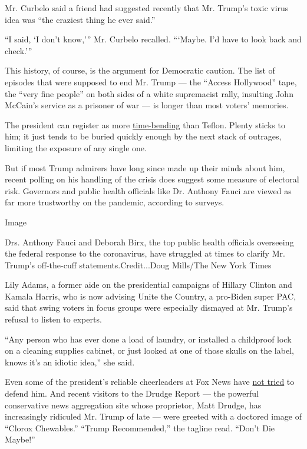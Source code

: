 Mr. Curbelo said a friend had suggested recently that Mr. Trump's toxic
virus idea was ``the craziest thing he ever said.''

``I said, `I don't know,''' Mr. Curbelo recalled. ```Maybe. I'd have to
look back and check.'''

This history, of course, is the argument for Democratic caution. The
list of episodes that were supposed to end Mr. Trump --- the ``Access
Hollywood'' tape, the ``very fine people'' on both sides of a white
supremacist rally, insulting John McCain's service as a prisoner of war
--- is longer than most voters' memories.

The president can register as more
\href{https://www.nytimes3xbfgragh.onion/2017/12/29/us/politics/trump-news-overload.html}{time-bending}
than Teflon. Plenty sticks to him; it just tends to be buried quickly
enough by the next stack of outrages, limiting the exposure of any
single one.

But if most Trump admirers have long since made up their minds about
him, recent polling on his handling of the crisis does suggest some
measure of electoral risk. Governors and public health officials like
Dr. Anthony Fauci are viewed as far more trustworthy on the pandemic,
according to surveys.

Image

Drs. Anthony Fauci and Deborah Birx, the top public health officials
overseeing the federal response to the coronavirus, have struggled at
times to clarify Mr. Trump's off-the-cuff statements.Credit...Doug
Mills/The New York Times

Lily Adams, a former aide on the presidential campaigns of Hillary
Clinton and Kamala Harris, who is now advising Unite the Country, a
pro-Biden super PAC, said that swing voters in focus groups were
especially dismayed at Mr. Trump's refusal to listen to experts.

``Any person who has ever done a load of laundry, or installed a
childproof lock on a cleaning supplies cabinet, or just looked at one of
those skulls on the label, knows it's an idiotic idea,'' she said.

Even some of the president's reliable cheerleaders at Fox News have
\href{https://www.nytimes3xbfgragh.onion/2020/04/24/business/media/virus-fox-trump-disinfectant.html}{not
tried} to defend him. And recent visitors to the Drudge Report --- the
powerful conservative news aggregation site whose proprietor, Matt
Drudge, has increasingly ridiculed Mr. Trump of late --- were greeted
with a doctored image of ``Clorox Chewables.'' ``Trump Recommended,''
the tagline read. ``Don't Die Maybe!''

